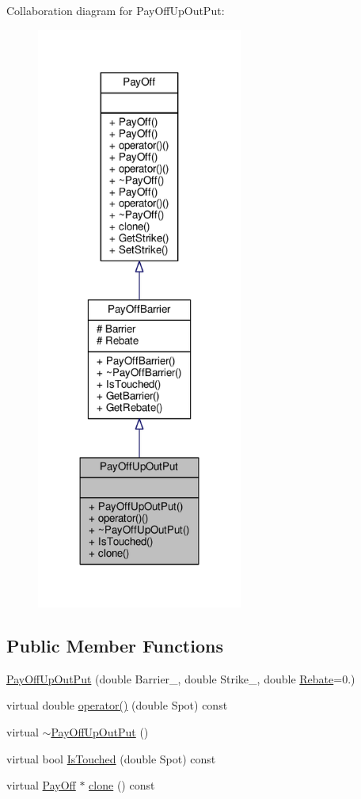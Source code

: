 Collaboration diagram for Pay\+Off\+Up\+Out\+Put\+:
\nopagebreak
\begin{figure}[H]
\begin{center}
\leavevmode
\includegraphics[width=192pt]{classPayOffUpOutPut__coll__graph}
\end{center}
\end{figure}
\subsection*{Public Member Functions}
\begin{DoxyCompactItemize}
\item 
\hyperlink{classPayOffUpOutPut_afcae251ac745e542c6110f19590bca14}{Pay\+Off\+Up\+Out\+Put} (double Barrier\+\_\+, double Strike\+\_\+, double \hyperlink{classPayOffBarrier_aca3ea631dcdb28a1df971b74774e41f8}{Rebate}=0.)
\item 
virtual double \hyperlink{classPayOffUpOutPut_a5ed17bb2111a9066eb6d29526a28a113}{operator()} (double Spot) const
\item 
virtual \hyperlink{classPayOffUpOutPut_ae7f29443c823d656a24f3272a75ea0f1}{$\sim$\+Pay\+Off\+Up\+Out\+Put} ()
\item 
virtual bool \hyperlink{classPayOffUpOutPut_a4b2900efde69ce09f2b0404729d0d61d}{Is\+Touched} (double Spot) const
\item 
virtual \hyperlink{classPayOff}{Pay\+Off} $\ast$ \hyperlink{classPayOffUpOutPut_ac754f661e8dbe25f447baddc8b2d302f}{clone} () const
\end{DoxyCompactItemize}
